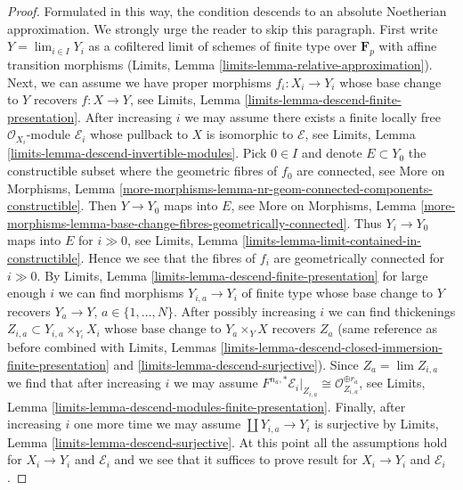 \begin{proof}
\medskip\noindent
Formulated in this way, the condition descends to an absolute
Noetherian approximation. We strongly urge the reader to skip
this paragraph. First write $Y = \lim_{i \in I} Y_i$ as a cofiltered limit
of schemes of finite type over $\mathbf{F}_p$ with affine transition
morphisms (Limits, Lemma \ref{limits-lemma-relative-approximation}).
Next, we can assume we have proper morphisms $f_i : X_i \to Y_i$
whose base change to $Y$ recovers $f : X \to Y$, see
Limits, Lemma \ref{limits-lemma-descend-finite-presentation}.
After increasing $i$ we may assume there exists a finite locally
free $\mathcal{O}_{X_i}$-module $\mathcal{E}_i$ whose pullback
to $X$ is isomorphic to $\mathcal{E}$, see
Limits, Lemma \ref{limits-lemma-descend-invertible-modules}.
Pick $0 \in I$ and denote $E \subset Y_0$ the constructible subset
where the geometric fibres of $f_0$ are connected, see
More on Morphisms, Lemma
\ref{more-morphisms-lemma-nr-geom-connected-components-constructible}.
Then $Y \to Y_0$ maps into $E$, see
More on Morphisms, Lemma
\ref{more-morphisms-lemma-base-change-fibres-geometrically-connected}.
Thus $Y_i \to Y_0$ maps into $E$ for $i \gg 0$, see
Limits, Lemma \ref{limits-lemma-limit-contained-in-constructible}.
Hence we see that the fibres of $f_i$ are geometrically connected
for $i \gg 0$. By Limits, Lemma \ref{limits-lemma-descend-finite-presentation}
for large enough $i$ we can find morphisms
$Y_{i, a} \to Y_i$ of finite type whose base change to $Y$
recovers $Y_a \to Y$, $a  \in \{1, \ldots, N\}$.
After possibly increasing $i$ we can find thickenings
$Z_{i, a} \subset Y_{i, a} \times_{Y_i} X_i$ whose base change
to $Y_a \times_Y X$ recovers $Z_a$ (same reference as before
combined with
Limits, Lemmas
\ref{limits-lemma-descend-closed-immersion-finite-presentation} and
\ref{limits-lemma-descend-surjective}).
Since $Z_a = \lim Z_{i, a}$ we find that after increasing $i$ we may assume
$F^{n_a, *}\mathcal{E}_i|_{Z_{i, a}} \cong
\mathcal{O}_{Z_{i, a}}^{\oplus r_a}$, see
Limits, Lemma \ref{limits-lemma-descend-modules-finite-presentation}.
Finally, after increasing $i$ one more time we may assume
$\coprod Y_{i, a} \to Y_i$ is surjective by
Limits, Lemma \ref{limits-lemma-descend-surjective}.
At this point all the assumptions hold for $X_i \to Y_i$
and $\mathcal{E}_i$ and we see that it suffices to prove result
for $X_i \to Y_i$ and $\mathcal{E}_i$.


\end{proof}
